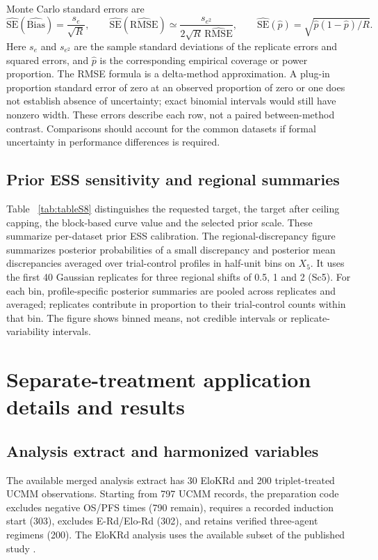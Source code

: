 \documentclass[11pt]{article}
\theoremstyle{remark}\newtheorem{remark}{Remark}[section]
\providecommand{\DIFaddtex}[1]{{\protect\color{blue} \sf #1}} %
\providecommand{\DIFaddbegin}{} %
\providecommand{\DIFaddend}{} %
\providecommand{\DIFadd}[1]{\texorpdfstring{\DIFaddtex{#1}}{#1}} %
\begin{document}
Monte Carlo standard errors are
\begin{equation}
\widehat{\mathrm{SE}}(\widehat{\mathrm{Bias}})=\frac{s_e}{\sqrt R},\qquad
\widehat{\mathrm{SE}}(\widehat{\mathrm{RMSE}})\simeq
\frac{s_{e^2}}{2\sqrt R\,\widehat{\mathrm{RMSE}}},\qquad
\widehat{\mathrm{SE}}(\widehat p)=\sqrt{\widehat p(1-\widehat p)/R}.
\end{equation}
Here $s_e$ and $s_{e^2}$ are the sample standard deviations of the replicate errors and squared errors, and $\widehat p$ is the corresponding empirical coverage or power proportion. The RMSE formula is a delta-method approximation. A plug-in proportion standard error of zero at an observed proportion of zero or one does not establish absence of uncertainty; exact binomial intervals would still have nonzero width. These errors describe each row, not a paired between-method contrast. Comparisons should account for the common datasets if formal uncertainty in performance differences is required.


\clearpage

\clearpage

\clearpage

\clearpage
\subsection{Prior ESS sensitivity and regional summaries}\label{sec:E.6}
Table \DIFaddbegin \DIFadd{~\ref{tab:tableS8} }\DIFaddend distinguishes the requested target, the target after ceiling capping, the block-based curve value and the selected prior scale. These summarize per-dataset prior ESS calibration. The regional-discrepancy figure summarizes  \DIFaddbegin \DIFadd{posterior probabilities }\DIFaddend of a small discrepancy and posterior mean  \DIFaddbegin \DIFadd{discrepancies }\DIFaddend averaged over trial-control profiles in half-unit bins on $X_5$. It uses the first 40 Gaussian replicates for three regional shifts of 0.5, 1 and 2 (Sc5). For each bin, profile-specific posterior summaries are pooled across replicates and averaged; replicates contribute in proportion to their trial-control counts within that bin. The figure shows binned means, not credible intervals or replicate-variability intervals.

\clearpage
 \section{ \DIFaddbegin \DIFadd{Separate-treatment application }\DIFaddend details and  results}\label{sec:F}
\subsection{Analysis extract and harmonized variables}\label{sec:F.1}
The available merged analysis extract has 30 EloKRd and 200 triplet-treated UCMM observations. Starting from 797 UCMM records, the preparation code excludes negative OS/PFS times (790 remain), requires a recorded induction start (303), excludes E-Rd/Elo-Rd (302), and retains verified three-agent regimens (200). The EloKRd analysis uses the available subset of the published study \citep{Derman2022}.
\end{document}
